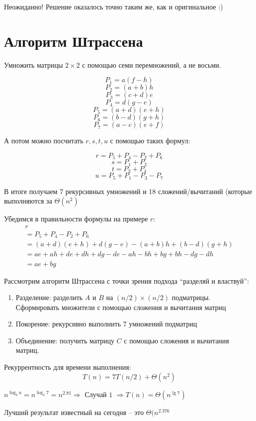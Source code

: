 \documentclass[a4paper,11pt]{article}
\begin{document}
Неожиданно! Решение оказалось точно таким же, как и оригинальное :)

\section{Алгоритм Штрассена}
Умножить матрицы $2 \times 2$ с помощью семи перемножений, а не восьми.

$$P_1 = a(f - h)$$
$$P_2 = (a + b)h$$
$$P_3 = (c + d)e$$
$$P_4 = d(g - e)$$
$$P_5 = (a + d)(e + h)$$
$$P_6 = (b - d)(g + h)$$
$$P_7 = (a - c)(e + f)$$

А потом можно посчитать $r, s, t, u$ с помощью таких формул:

$$r = P_5 + P_4 - P_2 + P_6$$
$$s = P_1 + P_2$$
$$t = P_3 + P_4$$
$$u = P_5 + P_1 - P_3 - P_7$$

В итоге получаем 7 рекурсивных умножений и 18 сложений/вычитаний (которые
выполняются за $\Theta(n^2)$

Убедимся в правильности формулы на примере $r$:
\begin{align*}
  r \\
  = P_5 + P_4 - P_2 + P_6 \\
  = (a + d)(e + h) + d(g - e) - (a + b)h + (b - d)(g + h) \\
  = ae + ah + de + dh + dg - de - ah - bh + bg + bh - dg - dh \\
  = ae + bg
\end{align*}

Рассмотрим алгоритм Штрассена с точки зрения подхода ``разделяй и властвуй'':

\begin{enumerate}
\item Разделение: разделить $A$ и $B$ на $(n/2) \times (n/2)$ подматрицы.
  Сформировать множители   с помощью сложения и вычитания матриц
\item Покорение: рекурсивно выполнить 7 умножений подматриц
\item Объединение: получить матрицу $C$ с помощью сложения и вычитания матриц.
\end{enumerate}

Рекуррентность для времени выполнения:
\begin{equation*}
  T(n) = 7T(n/2) + \Theta(n^2)
\end{equation*}

$n^{\log_b a} = n^{\log_2 7} = n^{2.81} \Rightarrow \text{ Случай 1 }
\Rightarrow T(n) = \Theta(n^{\lg 7})$

Лучший результат известный на сегодня -- это $\Theta(n^{2.376}$
\end{document}
